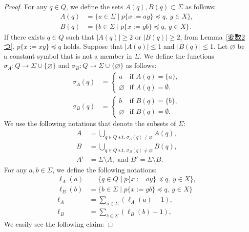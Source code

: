 \begin{proof}
For any $q \in Q$, we define the sets $A(q), B(q) \subset \Sigma$ as follows:
\begin{align*}
  A(q) & = \{ a \in \Sigma \mid p \{ x:=ay \} \preceq q,\ y\in X\},\\ 
  B(q) & = \{ b \in \Sigma \mid p \{ x:=yb \} \preceq q,\ y\in X\}.
  \end{align*}
  If there exists $q\in Q$ such that $|A(q)|\geq 2$ or $|B(q)|\geq 2$, from Lemma~\ref{変数2つ}, $p\{x := xy\} \preceq q$ holds.
Suppose that $|A(q)|\leq 1$ and $|B(q)|\leq 1$.
Let $\varnothing$ be a constant symbol that is not a member in $\Sigma$.
We define the functions $\sigma_{A}: Q \rightarrow \Sigma \cup \{\varnothing\}$ and $\sigma_{B}: Q \rightarrow \Sigma \cup \{\varnothing\}$ as follows:
\begin{align*}
  \sigma_{A}(q) & =
  \begin{cases}
    a & \textrm{if } A(q) = \{a\}, \\
    \varnothing & \textrm{if } A(q) = \emptyset.
  \end{cases}\\
  \sigma_{B}(q) & =
  \begin{cases}
    b & \textrm{if } B(q) = \{b\}, \\
    \varnothing & \textrm{if } B(q) = \emptyset.
  \end{cases}
\end{align*}
We use the following notations that denote the subsets of $\Sigma$:
\begin{align*}
  A & = \bigcup_{q \in Q \textrm{~s.t.~}\sigma_{A}(q) \not= \varnothing} A(q),\\
  B & = \bigcup_{q \in Q \textrm{~s.t.~}\sigma_{B}(q) \not= \varnothing} B(q),\\
  A' & = \Sigma \setminus A, \mbox{ and } B' = \Sigma \setminus B.
\end{align*}
For any $a,b \in \Sigma$, we define the following notations:
\begin{align*}
  \ell_{A}(a) & = \{ q \in Q \mid p \{ x:=ay \} \preceq q,\ y\in X\},\\ 
  \ell_{B}(b) & = \{ b \in \Sigma \mid p \{ x:=yb \} \preceq q,\ y\in X\}\\
  \ell_{A} &= \sum_{a \in \Sigma}(\ell_{A}(a) - 1),\\
  \ell_{B} &= \sum_{b\in \Sigma}(\ell_{B}(b) - 1),
\end{align*}
We easily see the following claim:  

\smallskip


\end{proof}
